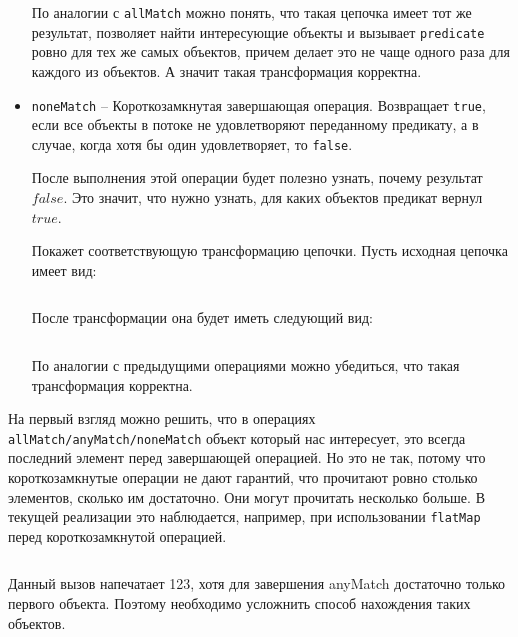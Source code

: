 \begin{itemize}
	По аналогии с \texttt{allMatch} можно понять, что такая цепочка имеет тот же результат, позволяет найти интересующие объекты и вызывает \texttt{predicate} ровно для тех же самых объектов, причем делает это не чаще одного раза для каждого из объектов. А значит такая трансформация корректна.
	\item \texttt{noneMatch} -- Короткозамкнутая завершающая операция. Возвращает \texttt{true}, если все объекты в потоке не удовлетворяют переданному предикату, а в случае, когда хотя бы один удовлетворяет, то \texttt{false}.
	
	После выполнения этой операции будет полезно узнать, почему результат $false$. Это значит, что нужно узнать, для каких объектов предикат вернул $true$. 
	
	Покажет соответствующую трансформацию цепочки. Пусть исходная цепочка имеет вид:
	\inputminted{java}{chapter2/code/anyMatch.java}
	
	После трансформации она будет иметь следующий вид:
	
	\inputminted{java}{chapter2/code/anyMatchTransform.java}
	
	По аналогии с предыдущими операциями можно убедиться, что такая трансформация корректна.
\end{itemize}

На первый взгляд можно решить, что в операциях \texttt{allMatch/anyMatch/noneMatch} объект который нас интересует, это всегда последний элемент перед завершающей операцией. Но это не так, потому что короткозамкнутые операции не дают гарантий, что прочитают ровно столько элементов, сколько им достаточно. Они могут прочитать несколько больше. В текущей реализации это наблюдается, например, при использовании \texttt{flatMap} перед короткозамкнутой операцией. 
\inputminted{java}{chapter2/code/flatMapBeforeAnyMatch.java}
Данный вызов напечатает 123, хотя для завершения anyMatch достаточно только первого объекта. Поэтому необходимо усложнить способ нахождения таких объектов.

